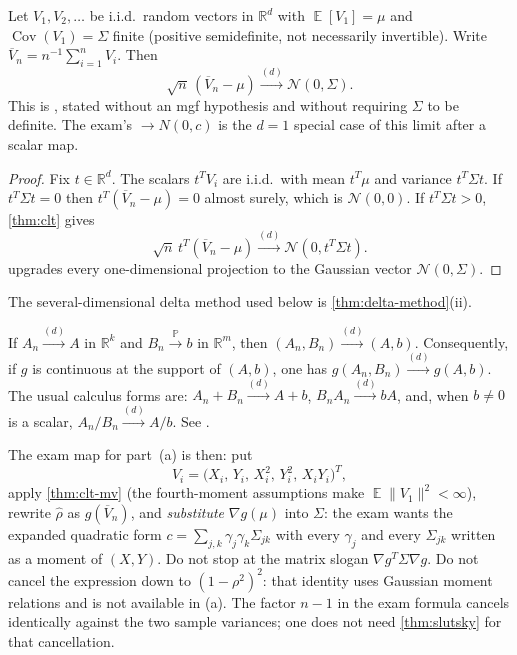 \documentclass[11pt,a4paper]{article}
\DeclareMathOperator{\E}{\mathbb{E}}
\DeclareMathOperator{\Pbb}{\mathbb{P}}
\begin{document}
\begin{theorem}
\label{thm:clt-mv}
Let \( V_1,V_2,\dots \) be i.i.d.\ random vectors in \( \mathbb{R}^{d} \) with \( \E[V_1]=\mu \) and \( \operatorname{Cov}(V_1)=\Sigma \) finite (positive semidefinite, not necessarily invertible). Write \( \overline{V}_n=n^{-1}\sum_{i=1}^{n}V_i \). Then
\[
\sqrt{n}\,(\overline{V}_n-\mu)
\xrightarrow{(d)}
\mathcal{N}(0,\Sigma).
\]
This is \citep[Theorem~5.4.4]{hogg2019}, stated without an mgf hypothesis and without requiring \( \Sigma \) to be definite. The exam's \( \longrightarrow N(0,c) \) is the \( d=1 \) special case of this limit after a scalar map.
\end{theorem}

\begin{proof}
Fix \( t\in\mathbb{R}^{d} \). The scalars \( t^{T}V_i \) are i.i.d.\ with mean \( t^{T}\mu \) and variance \( t^{T}\Sigma t \). If \( t^{T}\Sigma t=0 \) then \( t^{T}(\overline{V}_n-\mu)=0 \) almost surely, which is \( \mathcal{N}(0,0) \). If \( t^{T}\Sigma t>0 \), \cref{thm:clt} gives
\[
\sqrt{n}\,t^{T}(\overline{V}_n-\mu)
\xrightarrow{(d)}
\mathcal{N}(0,t^{T}\Sigma t).
\]
 upgrades every one-dimensional projection to the Gaussian vector \( \mathcal{N}(0,\Sigma) \).
\end{proof}

The several-dimensional delta method used below is \cref{thm:delta-method}(ii).

\begin{theorem}[Slutsky]
\label{thm:slutsky}
If \( A_n\xrightarrow{(d)}A \) in \( \mathbb{R}^{k} \) and \( B_n\xrightarrow{\Pbb}b \) in \( \mathbb{R}^{m} \), then \( (A_n,B_n)\xrightarrow{(d)}(A,b) \). Consequently, if \( g \) is continuous at the support of \( (A,b) \), one has \( g(A_n,B_n)\xrightarrow{(d)}g(A,b) \). The usual calculus forms are: \( A_n+B_n\xrightarrow{(d)}A+b \), \( B_n A_n\xrightarrow{(d)}bA \), and, when \( b\neq 0 \) is a scalar, \( A_n/B_n\xrightarrow{(d)}A/b \). See \citep[Theorem~5.2.5]{hogg2019}.
\end{theorem}

The exam map for part~(a) is then: put
\[
V_i
=
\bigl(X_i,\,Y_i,\,X_i^{2},\,Y_i^{2},\,X_i Y_i\bigr)^{T},
\]
apply \cref{thm:clt-mv} (the fourth-moment assumptions make \( \E\|V_1\|^{2}<\infty \)), rewrite \( \hat{\rho} \) as \( g(\overline{V}_n) \), and \emph{substitute} \( \nabla g(\mu) \) into \( \Sigma \): the exam wants the expanded quadratic form \( c=\sum_{j,k}\gamma_j\gamma_k\Sigma_{jk} \) with every \( \gamma_j \) and every \( \Sigma_{jk} \) written as a moment of \( (X,Y) \). Do not stop at the matrix slogan \( \nabla g^{T}\Sigma\nabla g \). Do not cancel the expression down to \( (1-\rho^{2})^{2} \): that identity uses Gaussian moment relations and is not available in (a). The factor \( n-1 \) in the exam formula cancels identically against the two sample variances; one does not need \cref{thm:slutsky} for that cancellation.
\end{document}
